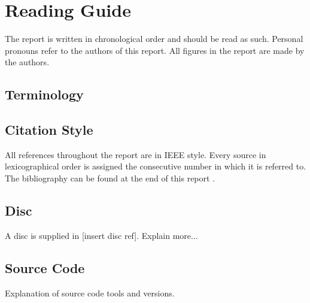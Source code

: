 \chapter*{Reading Guide}
The report is written in chronological order and should be read as such. Personal pronouns refer to the authors of this report. All figures in the report are made by the authors.

\section*{Terminology}

\section*{Citation Style}
All references throughout the report are in IEEE style. Every source in lexicographical order is assigned the consecutive number in which it is referred to. The bibliography can be found at the end of this report .

\section*{Disc}
A disc is supplied in [insert disc ref]. Explain more... %

\section*{Source Code}
Explanation of source code tools and versions.

